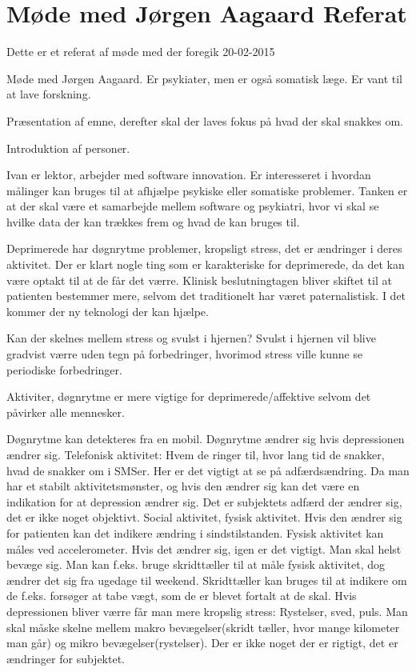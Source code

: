\chapter{Møde med Jørgen Aagaard Referat}\label{app:moede-med-joergen-referat}

Dette er et referat af møde med \citet{misc:jorgen-aagaard} der foregik 20-02-2015

Møde med Jørgen Aagaard. Er psykiater, men er også somatisk læge. Er vant til at lave forskning.

Præsentation af emne, derefter skal der laves fokus på hvad der skal snakkes om.

Introduktion af personer.

Ivan er lektor, arbejder med software innovation. Er interesseret i hvordan målinger kan bruges til at afhjælpe psykiske eller somatiske problemer. Tanken er at der skal være et samarbejde mellem software og psykiatri, hvor vi skal se hvilke data der kan trækkes frem og hvad de kan bruges til.

Deprimerede har døgnrytme problemer, kropsligt stress, det er ændringer i deres aktivitet. Der er klart nogle ting som er karakteriske for deprimerede, da det kan være optakt til at de får det værre. Klinisk beslutningtagen bliver skiftet til at patienten bestemmer mere, selvom det traditionelt har været paternalistisk. I det kommer der ny teknologi der kan hjælpe.

Kan der skelnes mellem stress og svulst i hjernen?
Svulst i hjernen vil blive gradvist værre uden tegn på forbedringer, hvorimod stress ville kunne se periodiske forbedringer.

Aktiviter, døgnrytme er mere vigtige for deprimerede/affektive selvom det påvirker alle mennesker. 

Døgnrytme kan detekteres fra en mobil. Døgnrytme ændrer sig hvis depressionen ændrer sig. 
Telefonisk aktivitet: Hvem de ringer til, hvor lang tid de snakker, hvad de snakker om i SMSer. Her er det vigtigt at se på adfærdsændring. Da man har et stabilt aktivitetsmønster, og hvis den ændrer sig kan det være en indikation for at depression ændrer sig. Det er subjektets adfærd der ændrer sig, det er ikke noget objektivt. 
Social aktivitet, fysisk aktivitet. Hvis den ændrer sig for patienten kan det indikere ændring i sindstilstanden. 
Fysisk aktivitet kan måles ved accelerometer. Hvis det ændrer sig, igen er det vigtigt. Man skal helst bevæge sig. Man kan f.eks. bruge skridttæller til at måle fysisk aktivitet, dog ændrer det sig fra ugedage til weekend. Skridttæller kan bruges til at indikere om de f.eks. forsøger at tabe vægt, som de er blevet fortalt at de skal. Hvis depressionen bliver værre får man mere kropslig stress: Rystelser, sved, puls. Man skal måske skelne mellem makro bevægelser(skridt tæller, hvor mange kilometer man går) og mikro bevægelser(rystelser). Der er ikke noget der er rigtigt, det er ændringer for subjektet.

